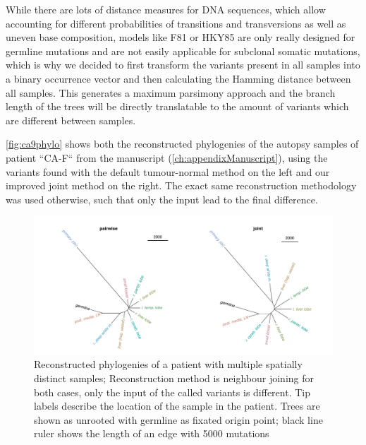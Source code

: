 While there are lots of distance measures for DNA sequences, which allow accounting for different probabilities of transitions and transversions as well as uneven base composition, models like F81 \cite{Felsenstein1981} or HKY85 \cite{Hasegawa1985} are only really designed for germline mutations and are not easily applicable for subclonal somatic mutations, which is why we decided to first transform the variants present in all samples into a binary occurrence vector and then calculating the Hamming distance \cite{Hamming1950} between all samples. This generates a maximum parsimony approach and the branch length of the trees will be directly translatable to the amount of variants which are different between samples. 

\autoref{fig:ca9phylo} shows both the reconstructed phylogenies of the autopsy samples of patient ``CA-F`` from the manuscript (\autoref{ch:appendixManuscript}), using the variants found with the default tumour-normal method on the left and our improved joint method on the right. The exact same reconstruction methodology was used otherwise, such that only the input lead to the final difference.

\begin{figure}[!ht]
\centering
\includegraphics[width=.99\linewidth]{Figures/phyloCA9.pdf}
\caption[Reconstructed phylogenies of joint samples]{Reconstructed phylogenies of a patient with multiple spatially distinct samples; Reconstruction method is neighbour joining for both cases, only the input of the called variants is different. Tip labels describe the location of the sample in the patient. Trees are shown as unrooted with germline as fixated origin point; black line ruler shows the length of an edge with 5000 mutations}\label{fig:ca9phylo}
\end{figure}



